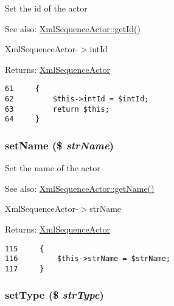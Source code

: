 Set the id of the actor

\begin{Desc}
\item[See also:]\hyperlink{class_xml_sequence_actor_12251d0c022e9e21c137a105ff683f13}{XmlSequenceActor::getId()} 

XmlSequenceActor-$>$intId \end{Desc}
\begin{Desc}
\item[Returns:]\hyperlink{class_xml_sequence_actor}{XmlSequenceActor} \end{Desc}


\begin{Code}\begin{verbatim}61     {
62         $this->intId = $intId;
63         return $this;
64     }
\end{verbatim}
\end{Code}


\hypertarget{class_xml_sequence_actor_c05d9184d52b7a34210a801767bef213}{
\subsubsection[{setName}]{\setlength{\rightskip}{0pt plus 5cm}setName (\$ {\em strName})}}
\label{class_xml_sequence_actor_c05d9184d52b7a34210a801767bef213}


Set the name of the actor

\begin{Desc}
\item[See also:]\hyperlink{class_xml_sequence_actor_3d0963e68bb313b163a73f2803c64600}{XmlSequenceActor::getName()} 

XmlSequenceActor-$>$strName \end{Desc}
\begin{Desc}
\item[Returns:]\hyperlink{class_xml_sequence_actor}{XmlSequenceActor} \end{Desc}


\begin{Code}\begin{verbatim}115     {
116         $this->strName = $strName;
117     }
\end{verbatim}
\end{Code}


\hypertarget{class_xml_sequence_actor_48d409343c54e747174ffaf5911b2cd9}{
\subsubsection[{setType}]{\setlength{\rightskip}{0pt plus 5cm}setType (\$ {\em strType})}}
\label{class_xml_sequence_actor_48d409343c54e747174ffaf5911b2cd9}


